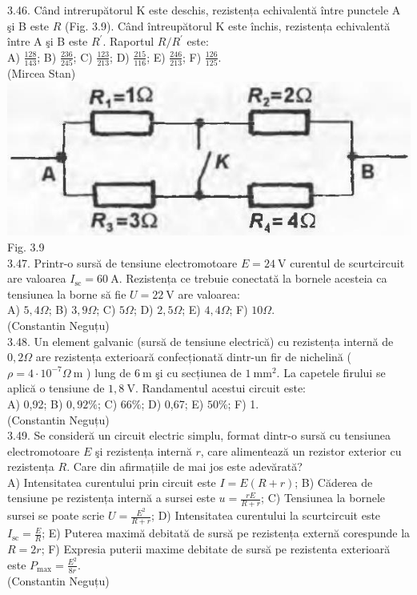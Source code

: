3.46. Când intrerupătorul K este deschis, rezistența echivalentă între punctele A şi B este $R$ (Fig. 3.9). Când întreupătorul K este închis, rezistența echivalentă între A şi B este $R^{\prime}$. Raportul $R / R^{\prime}$ este:\\ A) $\frac{128}{143}$; B) $\frac{236}{245}$; C) $\frac{123}{213}$; D) $\frac{215}{116}$; E) $\frac{246}{213}$; F) $\frac{126}{125}$.\\ (Mircea Stan)\\ \includegraphics[width=0.4\linewidth]{images/2025_07_01_5b3ff9fa0d508c8e9f17g-153} Fig. 3.9\\

3.47. Printr-o sursă de tensiune electromotoare $E=24 \mathrm{~V}$ curentul de scurtcircuit are valoarea $I_{\mathrm{sc}}=60 \mathrm{~A}$. Rezistența ce trebuie conectată la bornele acesteia ca tensiunea la borne să fie $U=22 \mathrm{~V}$ are valoarea:\\ A) $5,4 \Omega$; B) $3,9 \Omega$; C) $5 \Omega$; D) $2,5 \Omega$; E) $4,4 \Omega$; F) $10 \Omega$.\\ (Constantin Neguțu)\\

3.48. Un element galvanic (sursă de tensiune electrică) cu rezistența internă de $0,2 \Omega$ are rezistența exterioară confecționată dintr-un fir de nichelină ( $\rho=4 \cdot 10^{-7} \Omega \mathrm{~m}$ ) lung de $6 \mathrm{~m}$ şi cu secțiunea de $1 \mathrm{~mm}^{2}$. La capetele firului se aplică o tensiune de $1,8 \mathrm{~V}$. Randamentul acestui circuit este:\\ A) 0,92; B) $0,92 \%$; C) $66 \%$; D) 0,67; E) $50 \%$; F) 1.\\ (Constantin Neguțu)\\

3.49. Se consideră un circuit electric simplu, format dintr-o sursă cu tensiunea electromotoare $E$ şi rezistența internă $r$, care alimentează un rezistor exterior cu rezistența $R$. Care din afirmațiile de mai jos este adevărată?\\ A) Intensitatea curentului prin circuit este $I=E(R+r)$; B) Căderea de tensiune pe rezistența internă a sursei este $u=\frac{r E}{R+r}$; C) Tensiunea la bornele sursei se poate scrie $U=\frac{E^{2}}{R+r}$; D) Intensitatea curentului la scurtcircuit este $I_{\mathrm{sc}}=\frac{E}{R}$; E) Puterea maximă debitată de sursă pe rezistența externă corespunde la $R=2 r$; F) Expresia puterii maxime debitate de sursă pe rezistenta exterioară este $P_{\max }=\frac{E^{2}}{8 r}$.\\ (Constantin Neguțu)\\

